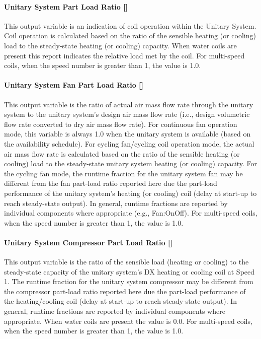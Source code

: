 \paragraph{Unitary System Part Load Ratio {[]}}\label{unitary-system-part-load-ratio}

This output variable is an indication of coil operation within the Unitary System. Coil operation is calculated based on the ratio of the sensible heating (or cooling) load to the steady-state heating (or cooling) capacity. When water coils are present this report indicates the relative load met by the coil. For multi-speed coils, when the speed number is greater than 1, the value is 1.0.

\paragraph{Unitary System Fan Part Load Ratio {[]}}\label{unitary-system-fan-part-load-ratio}

This output variable is the ratio of actual air mass flow rate through the unitary system to the unitary system's design air mass flow rate (i.e., design volumetric flow rate converted to dry air mass flow rate). For continuous fan operation mode, this variable is always 1.0 when the unitary system is available (based on the availability schedule). For cycling fan/cycling coil operation mode, the actual air mass flow rate is calculated based on the ratio of the sensible heating (or cooling) load to the steady-state unitary system heating (or cooling) capacity. For the cycling fan mode, the runtime fraction for the unitary system fan may be different from the fan part-load ratio reported here due the part-load performance of the unitary system's heating (or cooling) coil (delay at start-up to reach steady-state output). In general, runtime fractions are reported by individual components where appropriate (e.g., Fan:OnOff). For multi-speed coils, when the speed number is greater than 1, the value is 1.0.

\paragraph{Unitary System Compressor Part Load Ratio {[]}}\label{unitary-system-compressor-part-load-ratio}

This output variable is the ratio of the sensible load (heating or cooling) to the steady-state capacity of the unitary system's DX heating or cooling coil at Speed 1. The runtime fraction for the unitary system compressor may be different from the compressor part-load ratio reported here due the part-load performance of the heating/cooling coil (delay at start-up to reach steady-state output). In general, runtime fractions are reported by individual components where appropriate. When water coils are present the value is 0.0. For multi-speed coils, when the speed number is greater than 1, the value is 1.0.

